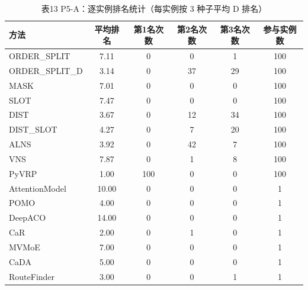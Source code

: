\begin{table}[htbp]
\centering
\caption{表13 P5-A：逐实例排名统计（每实例按 3 种子平均 D 排名）}
\label{tab:p5_13}
\begin{tabular}{lccccc}
\toprule
方法 & 平均排名 & 第1名次数 & 第2名次数 & 第3名次数 & 参与实例数 \\
\midrule
ORDER_SPLIT & 7.11 & 0 & 0 & 1 & 100 \\
ORDER_SPLIT_D & 3.14 & 0 & 37 & 29 & 100 \\
MASK & 7.01 & 0 & 0 & 0 & 100 \\
SLOT & 7.47 & 0 & 0 & 0 & 100 \\
DIST & 3.67 & 0 & 12 & 34 & 100 \\
DIST_SLOT & 4.27 & 0 & 7 & 20 & 100 \\
ALNS & 3.92 & 0 & 42 & 7 & 100 \\
VNS & 7.87 & 0 & 1 & 8 & 100 \\
PyVRP & 1.00 & 100 & 0 & 0 & 100 \\
AttentionModel & 10.00 & 0 & 0 & 0 & 1 \\
POMO & 4.00 & 0 & 0 & 0 & 1 \\
DeepACO & 14.00 & 0 & 0 & 0 & 1 \\
CaR & 2.00 & 0 & 1 & 0 & 1 \\
MVMoE & 7.00 & 0 & 0 & 0 & 1 \\
CaDA & 5.00 & 0 & 0 & 0 & 1 \\
RouteFinder & 3.00 & 0 & 0 & 1 & 1 \\
\bottomrule
\end{tabular}
\end{table}

